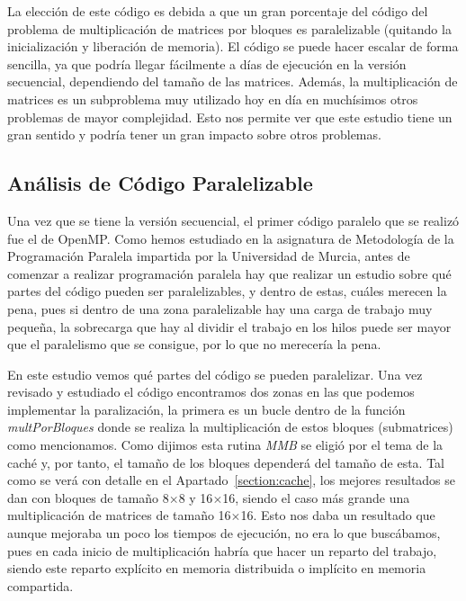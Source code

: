 \documentclass[a4paper,12pt]{article}
\begin{document}
La elección de este código es debida a que un gran porcentaje del código del problema de multiplicación de matrices por bloques es paralelizable (quitando la inicialización y liberación de memoria). El código se puede hacer escalar de forma sencilla, ya que podría llegar fácilmente a días de ejecución en la versión secuencial, dependiendo del tamaño de las matrices. Además, la multiplicación de matrices es un subproblema muy utilizado hoy en día en muchísimos otros problemas de mayor complejidad. Esto nos permite ver que este estudio tiene un gran sentido y podría tener un gran impacto sobre otros problemas.



\subsection{Análisis de Código Paralelizable}

Una vez que se tiene la versión secuencial, el primer código paralelo que se realizó fue el de OpenMP. Como hemos estudiado en la asignatura de Metodología de la Programación Paralela impartida por la Universidad de Murcia, antes de comenzar a realizar programación paralela hay que realizar un estudio sobre qué partes del código pueden ser paralelizables, y dentro de estas, cuáles merecen la pena, pues si dentro de una zona paralelizable hay una carga de trabajo muy pequeña, la sobrecarga que hay al dividir el trabajo en los hilos puede ser mayor que el paralelismo que se consigue, por lo que no merecería la pena.

En este estudio vemos qué partes del código se pueden paralelizar. Una vez revisado y estudiado el código  encontramos dos zonas en las que podemos implementar la paralización, la primera es un bucle dentro de la función {\it multPorBloques} donde se realiza la multiplicación de estos bloques (submatrices) como mencionamos. Como dijimos esta rutina {\it MMB} se eligió por el tema de la caché y, por tanto, el tamaño de los bloques dependerá del tamaño de esta. Tal como se verá con detalle en el Apartado~\ref{section:cache}, los mejores resultados se dan con bloques de tamaño 8$\times$8 y 16$\times$16, siendo el caso más grande una multiplicación de matrices de tamaño 16$\times$16. Esto nos daba un resultado que aunque mejoraba un poco los tiempos de ejecución, no era lo que buscábamos, pues en cada inicio de multiplicación habría que hacer un reparto del trabajo, siendo este reparto explícito en memoria distribuida o implícito en memoria compartida.
\end{document}
